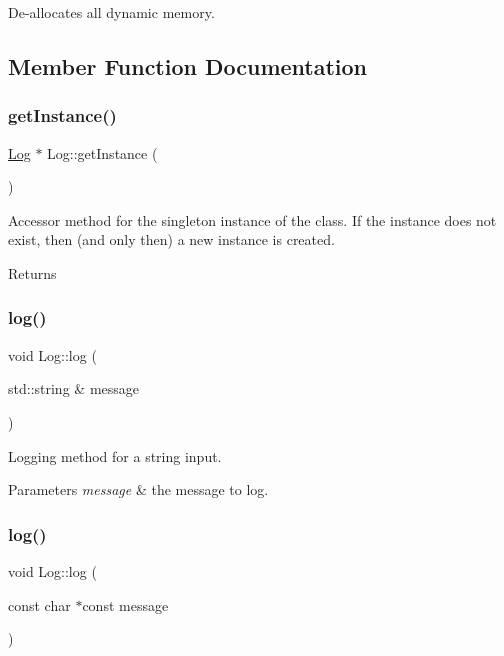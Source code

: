 De-\/allocates all dynamic memory. 

\subsection{Member Function Documentation}
\hypertarget{classLog_a987f3ff401eea783d0e80daaea1d7aca}{}\label{classLog_a987f3ff401eea783d0e80daaea1d7aca} 
\subsubsection{\texorpdfstring{get\+Instance()}{getInstance()}}
{\ttfamily \hyperlink{classLog}{Log} $\ast$ Log\+::get\+Instance (\begin{DoxyParamCaption}{ }\end{DoxyParamCaption})\hspace{0.3cm}{\ttfamily [static]}}

Accessor method for the singleton instance of the class. If the instance does not exist, then (and only then) a new instance is created. \begin{DoxyReturn}{Returns}

\end{DoxyReturn}
\hypertarget{classLog_ac4365b77dc0b64c77e577888dfab5099}{}\label{classLog_ac4365b77dc0b64c77e577888dfab5099} 
\subsubsection{\texorpdfstring{log()}{log()}\hspace{0.1cm}{\footnotesize\ttfamily [1/2]}}
{\ttfamily void Log\+::log (\begin{DoxyParamCaption}\item[{std\+::string \&}]{message }\end{DoxyParamCaption})}

Logging method for a string input. 
\begin{DoxyParams}{Parameters}
{\em message} & the message to log. \\
\hline
\end{DoxyParams}
\hypertarget{classLog_a60929e600b7759e97ea623ea5b05971e}{}\label{classLog_a60929e600b7759e97ea623ea5b05971e} 
\subsubsection{\texorpdfstring{log()}{log()}\hspace{0.1cm}{\footnotesize\ttfamily [2/2]}}
{\ttfamily void Log\+::log (\begin{DoxyParamCaption}\item[{const char $\ast$const}]{message }\end{DoxyParamCaption})}

